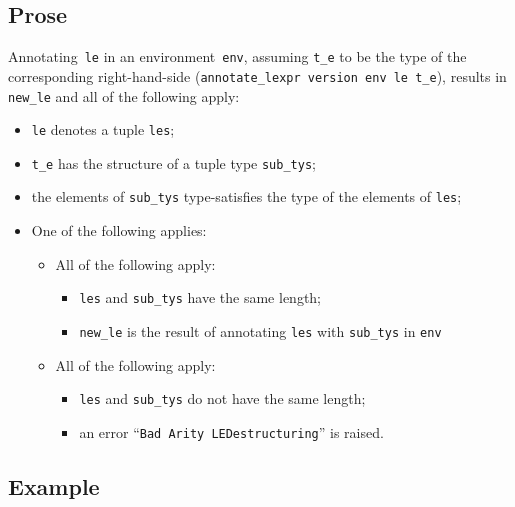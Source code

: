 \documentclass{book}
\begin{document}
\begin{itemize}
  \subsection{Prose}
   Annotating~\texttt{le} in an environment~\texttt{env}, assuming
\texttt{t\_e} to be the type of the corresponding right-hand-side
(\texttt{annotate\_lexpr version env le t\_e}), results in \texttt{new\_le} and
all of the following apply:
   \begin{itemize}
   \item \texttt{le} denotes a tuple \texttt{les};
   \item \texttt{t\_e} has the structure of a tuple type \texttt{sub\_tys};
   \item the elements of \texttt{sub\_tys} type-satisfies the type of the elements of \texttt{les};
   \item One of the following applies:
     \begin{itemize}
     \item All of the following apply:
       \begin{itemize}
       \item \texttt{les} and \texttt{sub\_tys} have the same length;
       \item \texttt{new\_le} is the result of annotating \texttt{les} with \texttt{sub\_tys} in \texttt{env}
       \end{itemize}
     \item All of the following apply:
       \begin{itemize}
       \item \texttt{les} and \texttt{sub\_tys} do not have the same length;
       \item an error ``\texttt{Bad Arity LEDestructuring}'' is raised.
       \end{itemize}
     \end{itemize}
   \end{itemize}

  \subsection{Example}



\begin{emptyformal}

\end{emptyformal}
\end{itemize}
\end{document}
